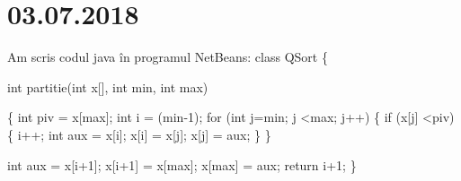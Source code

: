 \documentclass{report}
\begin{document}
\chapter{03.07.2018}
Am scris codul java în programul NetBeans:
\newline
class QSort\newline
\{
 
	    int partitie(int x[], int min, int max)
    
	\{\newline
		\hspace*{1cm} int piv = x[max];\newline
		\hspace*{1cm}int i = (min-1);\newline
		\hspace*{1cm}for (int j=min; j \textless max; j++)\newline
		\hspace*{1cm}\{\newline
			\hspace*{1.5cm}if (x[j] \textless piv)\newline
              \hspace*{1.5cm}\{\newline
              \hspace*{2cm} i++;\newline
		      \hspace*{2cm}int aux = x[i];\newline
		      \hspace*{2cm}x[i] = x[j];\newline
		      \hspace*{2cm}x[j] = aux;\newline
              \hspace*{1.5cm}\}\newline
         \hspace*{1cm}\}\newline   
         
         \hspace*{1cm}int aux = x[i+1];\newline
		 \hspace*{1cm}x[i+1] = x[max];\newline
		 \hspace*{1cm}x[max] = aux;\newline
		 \hspace*{1cm}return i+1;\newline
       \}\newline  
       
\end{document}
